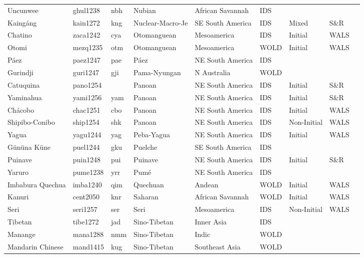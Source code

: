 \begin{longtable}{lllllllll}
  Uncunwee & ghul1238 & nbh & Nubian & African Savannah & IDS &  &  &  \\ 
  Kaingáng & kain1272 & kng & Nuclear-Macro-Je & SE South America & IDS & Mixed & S\&R & \cite[163-171]{dasilva_kaingang-paulista2011}\cite[156]{wieseman_kaingang1972.pdf} \\ 
  Chatino  & zaca1242 & cya & Otomanguean & Mesoamerica & IDS & Initial & WALS &  \\ 
  Otomi & mezq1235 & otm & Otomanguean & Mesoamerica & WOLD & Initial & WALS &  \\ 
  Páez & paez1247 & pae & Páez & NE South America & IDS &  &  &  \\ 
  Gurindji & guri1247 & gji & Pama-Nyungan & N Australia & WOLD &  &  &  \\ 
  Catuquina & pano1254 &  & Panoan & NE South America & IDS & Initial & S\&R & \cite[38]{aguiar_katukina1988}\cite[231]{aguiar_katukina1994_o.pdf} \\ 
  Yaminahua & yami1256 & yam & Panoan & NE South America & IDS & Initial & S\&R & \cite[32..]{FaustLoosGramaticaYaminahua.pdf} \\ 
  Chácobo & chac1251 & cbo & Panoan & NE South America & IDS & Initial & WALS &  \\ 
  Shipibo-Conibo & ship1254 & shk & Panoan & NE South America & IDS & Non-Initial & WALS &  \\ 
  Yagua & yagu1244 & yag & Peba-Yagua & NE South America & IDS & Initial & WALS &  \\ 
  Gününa Küne & puel1244 & gku & Puelche & SE South America & IDS &  &  &  \\ 
  Puinave & puin1248 & pui & Puinave & NE South America & IDS & Initial & S\&R & \cite[209]{higuita_puinave2008_s.pdf} \\ 
  Yaruro & pume1238 & yrr & Pumé & NE South America & IDS &  &  &  \\ 
  Imbabura Quechua & imba1240 & qim & Quechuan & Andean & WOLD & Initial & WALS &  \\ 
  Kanuri & cent2050 & knr & Saharan & African Savannah & WOLD & Initial & WALS &  \\ 
  Seri & seri1257 & ser & Seri & Mesoamerica & IDS & Non-Initial & WALS &  \\ 
  Tibetan & tibe1272 & jad & Sino-Tibetan & Inner Asia & IDS &  &  &  \\ 
  Manange & mana1288 & nmm & Sino-Tibetan & Indic & WOLD &  &  &  \\ 
  Mandarin Chinese & mand1415 & kug & Sino-Tibetan & Southeast Asia & WOLD &  &  &  \\ 

\end{longtable}
